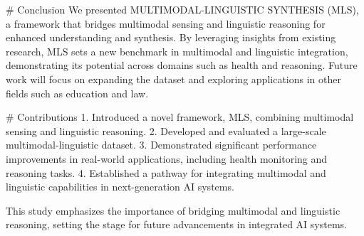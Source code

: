 # Conclusion  
We presented MULTIMODAL-LINGUISTIC SYNTHESIS (MLS), a framework that bridges multimodal sensing and linguistic reasoning for enhanced understanding and synthesis. By leveraging insights from existing research, MLS sets a new benchmark in multimodal and linguistic integration, demonstrating its potential across domains such as health and reasoning. Future work will focus on expanding the dataset and exploring applications in other fields such as education and law.

# Contributions  
1. Introduced a novel framework, MLS, combining multimodal sensing and linguistic reasoning.  
2. Developed and evaluated a large-scale multimodal-linguistic dataset.  
3. Demonstrated significant performance improvements in real-world applications, including health monitoring and reasoning tasks.  
4. Established a pathway for integrating multimodal and linguistic capabilities in next-generation AI systems.  

This study emphasizes the importance of bridging multimodal and linguistic reasoning, setting the stage for future advancements in integrated AI systems.